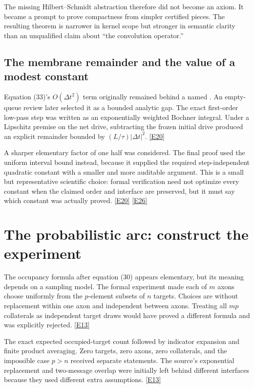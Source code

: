 \documentclass[11pt,a4paper]{article}
\newcommand{\artifact}[1]{\texttt{\detokenize{#1}}}
\newcommand{\ev}[1]{%
  \hyperref[ev:#1]{\textcolor{ReportBlue}{\textsf{\scriptsize[#1]}}}}
\begin{document}
The missing Hilbert--Schmidt abstraction therefore did not become an axiom. It became
a prompt to prove compactness from simpler certified pieces. The resulting theorem
is narrower in kernel scope but stronger in semantic clarity than an unqualified
claim about ``the convolution operator.''

\subsection{The membrane remainder and the value of a modest constant}

Equation (33)'s \(O(\Delta t^2)\) term originally remained behind a named
\artifact{QuadraticRemainder}. An empty-queue review later selected it as a bounded
analytic gap. The exact first-order low-pass step was written as an exponentially
weighted Bochner integral. Under a Lipschitz premise on the net drive, subtracting
the frozen initial drive produced an explicit remainder bounded by
\((L/\tau)|\Delta t|^2\). \ev{E20}

A sharper elementary factor of one half was considered. The final proof used the
uniform interval bound instead, because it supplied the required step-independent
quadratic constant with a smaller and more auditable argument. This is a small but
representative scientific choice: formal verification need not optimize every
constant when the claimed order and interface are preserved, but it must say which
constant was actually proved. \ev{E20}\ev{E26}

\section{The probabilistic arc: construct the experiment}
\label{sec:probability-arc}

The occupancy formula after equation (30) appears elementary, but its meaning depends
on a sampling model. The formal experiment made each of \(m\) axons choose uniformly
from the \(p\)-element subsets of \(n\) targets. Choices are without replacement
within one axon and independent between axons. Treating all \(mp\) collaterals as
independent target draws would have proved a different formula and was explicitly
rejected. \ev{E13}

The exact expected occupied-target count followed by indicator expansion and finite
product averaging. Zero targets, zero axons, zero collaterals, and the impossible
case \(p>n\) received separate statements. The source's exponential replacement and
two-message overlap were initially left behind different interfaces because they
used different extra assumptions. \ev{E13}
\end{document}
